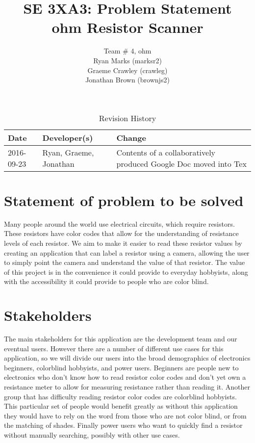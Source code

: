 \documentclass{article}
\title{SE 3XA3: Problem Statement\\ohm Resistor Scanner}
\author{Team \# 4, ohm
		\\ Ryan Marks (marksr2)
		\\ Graeme Crawley (crawleg)
		\\ Jonathan Brown (brownjs2)
}
\date{}
\begin{document}
\begin{table}[hp]
\caption{Revision History} \label{TblRevisionHistory}
\begin{tabularx}{\textwidth}{llX}
\toprule
\textbf{Date} & \textbf{Developer(s)} & \textbf{Change}\\
\midrule
2016-09-23 & Ryan, Graeme, Jonathan & Contents of a collaboratively produced Google Doc moved into Tex\\
\bottomrule
\end{tabularx}
\end{table}

\newpage

\maketitle

\section{Statement of problem to be solved}

Many people around the world use electrical circuits, which require resistors.
These resistors have color codes that allow for the understanding of resistance levels of each resistor.
We aim to make it easier to read these resistor values by creating an application that can label a resistor using a camera, 
allowing the user to simply point the camera and understand the value of that resistor. 
The value of this project is in the convenience it could provide to everyday hobbyists, along with the accessibility it could provide to people who are color blind.

\section{Stakeholders}

The main stakeholders for this application are the development team and our eventual users. 
However there are a number of different use cases for this application, so we will divide our users into the broad demographics of electronics beginners, colorblind hobbyists, and power users. Beginners are people new to electronics who don’t know how to read resistor color codes and don’t yet own a resistance meter to allow for measuring resistance rather than reading it.
Another group that has difficulty reading resistor color codes are colorblind hobbyists. 
This particular set of people would benefit greatly as without this application they would have to rely on the word from those who are not color blind, or from the matching of shades. 
Finally power users who want to quickly find a resistor without manually searching, possibly with other use cases.
\end{document}
